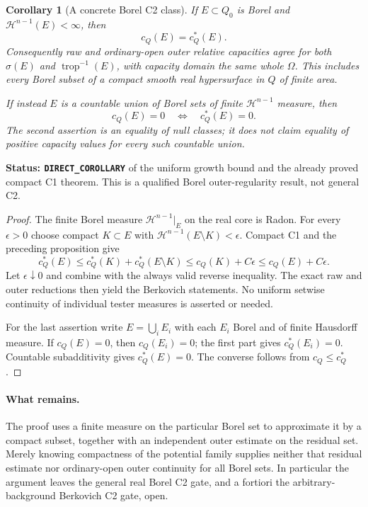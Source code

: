 \documentclass[11pt,a4paper]{article}
\numberwithin{equation}{section}
\newtheorem{corollary}[theorem]{Corollary}
\theoremstyle{definition}
\theoremstyle{remark}
\begin{document}
\begin{corollary}[A concrete Borel C2 class]
\label{cor:r6-gauss-finite-hausdorff-C2}
If $E\subset Q_0$ is Borel and
$\mathcal H^{n-1}(E)<\infty$, then
\[
                         c_Q(E)=c_Q^*(E).
\]
Consequently raw and ordinary-open outer relative capacities agree
for both $\sigma(E)$ and $\operatorname{trop}^{-1}(E)$, with capacity
domain the same whole $\Omega$. This includes every Borel subset of
a compact smooth real hypersurface in $Q$ of finite area.

If instead $E$ is a countable union of Borel sets of finite
$\mathcal H^{n-1}$ measure, then
\[
                  c_Q(E)=0\quad\Longleftrightarrow\quad c_Q^*(E)=0.
\]
The second assertion is an equality of null classes; it does not
claim equality of positive capacity values for every such countable
union.
\end{corollary}

\noindent\textbf{Status: \texttt{DIRECT\_COROLLARY}} of the
uniform growth bound and the already proved compact C1 theorem.
This is a qualified Borel outer-regularity result, not general C2.

\begin{proof}
The finite Borel measure
$\mathcal H^{n-1}|_E$ on the real core is Radon. For every
$\epsilon>0$ choose compact $K\subset E$ with
$\mathcal H^{n-1}(E\setminus K)<\epsilon$. Compact C1 and the
preceding proposition give
\[
 c_Q^*(E)
   \le c_Q^*(K)+c_Q^*(E\setminus K)
   \le c_Q(K)+C\epsilon
   \le c_Q(E)+C\epsilon.
\]
Let $\epsilon\downarrow0$ and combine with the always valid reverse
inequality. The exact raw and outer reductions then yield the
Berkovich statements. No uniform setwise continuity of individual
tester measures is asserted or needed.

For the last assertion write $E=\bigcup_iE_i$ with each $E_i$ Borel
and of finite Hausdorff measure. If $c_Q(E)=0$, then $c_Q(E_i)=0$;
the first part gives $c_Q^*(E_i)=0$. Countable subadditivity gives
$c_Q^*(E)=0$. The converse follows from $c_Q\le c_Q^*$.
\end{proof}

\paragraph{What remains.}
The proof uses a finite measure on the particular Borel set to
approximate it by a compact subset, together with an independent
outer estimate on the residual set. Merely knowing compactness of
the potential family supplies neither that residual estimate nor
ordinary-open outer continuity for all Borel sets. In particular the
argument leaves the general real Borel C2 gate, and a fortiori the
arbitrary-background Berkovich C2 gate, open.
\end{document}
